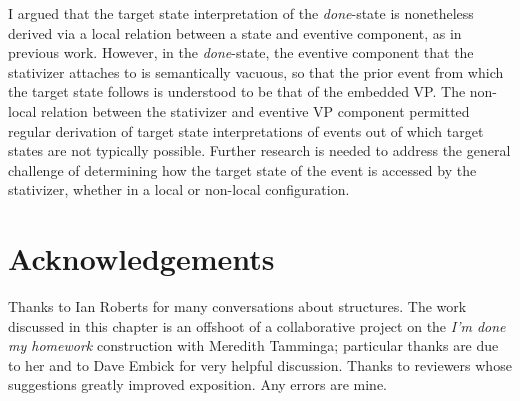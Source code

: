\documentclass[output=paper,modfonts,nonflat]{langsci/langscibook}
\begin{document}
I argued that the target state interpretation of the \emph{done}-state is
nonetheless derived via a local relation between a state and eventive
component, as in previous work. However, in the \emph{done}-state, the eventive
component that the stativizer attaches to is semantically vacuous, so that the
prior event from which the target state follows is understood to be that of the
embedded VP\@. The non-local relation between the stativizer and eventive VP
component permitted regular derivation of target state interpretations of
events out of which target states are not typically possible. Further research
is needed to address the general challenge of determining how the target state
of the event is accessed by the stativizer, whether in a local or non-local
configuration.



\printchapterglossary{}

\section*{Acknowledgements}

Thanks to Ian Roberts for many conversations about  structures. The work
discussed in this chapter is an offshoot of a collaborative project on the
\emph{I'm done my homework} construction with Meredith Tamminga; particular
thanks are due to her and to Dave Embick for very helpful discussion. Thanks to
reviewers whose suggestions greatly improved exposition. Any errors are mine.

{\sloppy
\printbibliography[heading=subbibliography,notkeyword=this]
}
\end{document}
